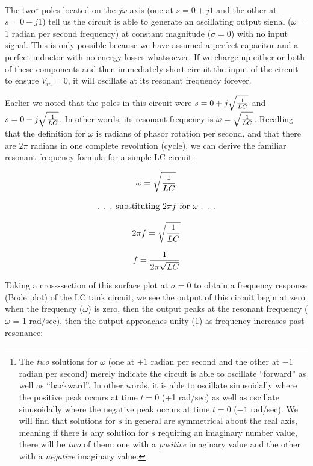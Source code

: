 The two\footnote{The \textit{two} solutions for $\omega$ (one at +1 radian per second and the other at $-1$ radian per second) merely indicate the circuit is able to oscillate ``forward'' as well as ``backward''.  In other words, it is able to oscillate sinusoidally where the positive peak occurs at time $t = 0$ (+1 rad/sec) as well as oscillate sinusoidally where the negative peak occurs at time $t = 0$ ($-1$ rad/sec).  We will find that solutions for $s$ in general are symmetrical about the real axis, meaning if there is any solution for $s$ requiring an imaginary number value, there will be \textit{two} of them: one with a \textit{positive} imaginary value and the other with a \textit{negative} imaginary value.} poles located on the $j \omega$ axis (one at $s = 0 + j1$ and the other at $s = 0 - j1$) tell us the circuit is able to generate an oscillating output signal ($\omega$ = 1 radian per second frequency) at constant magnitude ($\sigma = 0$) with no input signal.  This is only possible because we have assumed a perfect capacitor and a perfect inductor with no energy losses whatsoever.  If we charge up either or both of these components and then immediately short-circuit the input of the circuit to ensure $V_{in} = 0$, it will oscillate at its resonant frequency forever.

\filbreak

Earlier we noted that the poles in this circuit were $s = 0 + j \sqrt{1 \over LC}$ and $s = 0 - j \sqrt{1 \over LC}$.  In other words, its resonant frequency is $\omega = \sqrt{1 \over LC}$.  Recalling that the definition for $\omega$ is radians of phasor rotation per second, and that there are $2 \pi$ radians in one complete revolution (cycle), we can derive the familiar resonant frequency formula for a simple LC circuit:

$$\omega = \sqrt{1 \over LC}$$

$$\hbox{. . . substituting } 2 \pi f \hbox{ for } \omega \hbox{ . . .}$$

$$2 \pi f = \sqrt{1 \over LC}$$

$$f = {1 \over 2 \pi \sqrt{LC}}$$

Taking a cross-section of this surface plot at $\sigma = 0$ to obtain a frequency response (Bode plot) of the LC tank circuit, we see the output of this circuit begin at zero when the frequency ($\omega$) is zero, then the output peaks at the resonant frequency ($\omega$ = 1 rad/sec), then the output approaches unity (1) as frequency increases past resonance:

